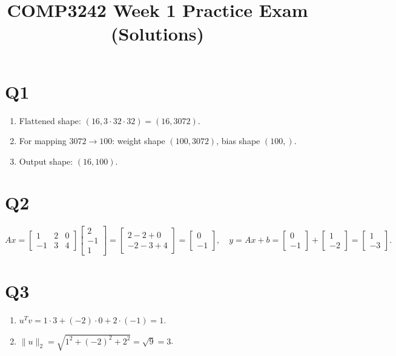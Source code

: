 \documentclass[11pt]{article}
\title{COMP3242 Week 1 Practice Exam (Solutions)}
\date{}
\begin{document}
\maketitle

\section*{Q1}
\begin{enumerate}[label=(\alph*)]
  \item Flattened shape: $(16, 3\cdot 32\cdot 32)=(16,3072)$.
  \item For mapping $3072\to 100$: weight shape $(100,3072)$, bias shape $(100,)$. 
  \item Output shape: $(16,100)$.
\end{enumerate}

\section*{Q2}
\[
Ax=\begin{bmatrix}1&2&0\\-1&3&4\end{bmatrix}
\begin{bmatrix}2\\-1\\1\end{bmatrix}
=\begin{bmatrix}2-2+0\\-2-3+4\end{bmatrix}
=\begin{bmatrix}0\\-1\end{bmatrix},
\quad
y=Ax+b=\begin{bmatrix}0\\-1\end{bmatrix}+\begin{bmatrix}1\\-2\end{bmatrix}=\begin{bmatrix}1\\-3\end{bmatrix}.
\]

\section*{Q3}
\begin{enumerate}[label=(\alph*)]
  \item $u^Tv=1\cdot 3+(-2)\cdot 0+2\cdot(-1)=1$.
  \item $\lVert u\rVert_2=\sqrt{1^2+(-2)^2+2^2}=\sqrt{9}=3$.
\end{enumerate}
\end{document}
